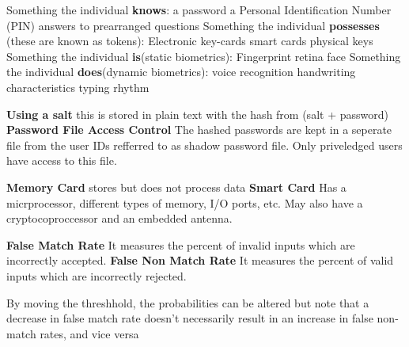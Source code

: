 \documentclass[../CIT288SecurityResearchNotebook.tex]{subfiles}
\begin{document}


\begin{outline}
  \1 Something the individual {\bf{knows}}:
    \2 a password
    \2 a Personal Identification Number (PIN)
    \2 answers to prearranged questions
  \1 Something the individual {\bf{possesses}} (these are known as tokens):
    \2 Electronic key-cards
    \2 smart cards
    \2 physical keys
  \1 Something the individual {\bf{is}}(static biometrics):
    \2 Fingerprint
    \2 retina
    \2 face
  \1 Something the individual {\bf{does}}(dynamic biometrics):
    \2 voice recognition
    \2 handwriting characteristics
    \2 typing rhythm
\end{outline}



\begin{outline}
  \1 {\bf{Using a salt}} this is stored in plain text with the hash from (salt + password)
  \1 {\bf{Password File Access Control}} The hashed passwords are kept in a seperate file from the user IDs refferred to as shadow password file. Only priveledged users have access to this file.
\end{outline}


\begin{outline}
  \1 {\bf{Memory Card}} stores but does not process data
  \1 {\bf{Smart Card}} Has a micrprocessor, different types of memory, I/O ports, etc. May also have a cryptocoproccessor and an embedded antenna.
\end{outline}


\begin{outline}
  \1 {\bf{False Match Rate}} It measures the percent of invalid inputs which are incorrectly accepted.
  \1 {\bf{False Non Match Rate}} It measures the percent of valid inputs which are incorrectly rejected.
\end{outline}
By moving the threshhold, the probabilities can be altered but note that a decrease in false match rate doesn't necessarily result in an increase in false non-match rates, and vice versa
\end{document}
